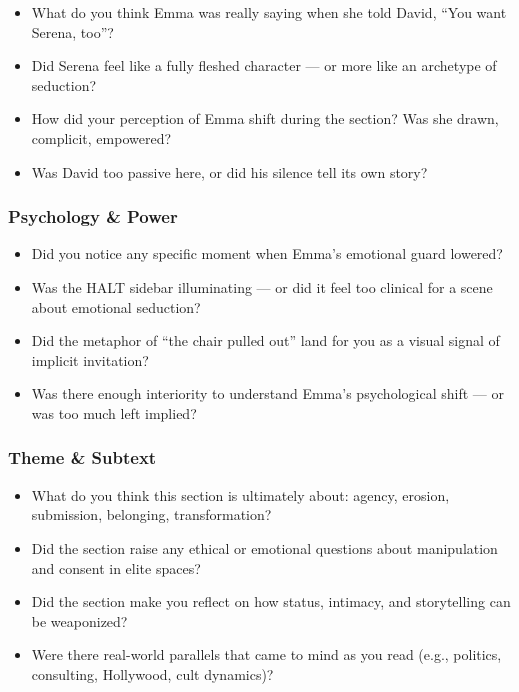 \begin{itemize}
\item What do you think Emma was really saying when she told David, “You want Serena, too”?
\item Did Serena feel like a fully fleshed character — or more like an archetype of seduction?
\item How did your perception of Emma shift during the section? Was she drawn, complicit, empowered?
\item Was David too passive here, or did his silence tell its own story?
\end{itemize}

\subsubsection{Psychology \& Power}

\begin{itemize}
\item Did you notice any specific moment when Emma’s emotional guard lowered?
\item Was the HALT sidebar illuminating — or did it feel too clinical for a scene about emotional seduction?
\item Did the metaphor of “the chair pulled out” land for you as a visual signal of implicit invitation?
\item Was there enough interiority to understand Emma’s psychological shift — or was too much left implied?
\end{itemize}

\subsubsection{Theme \& Subtext}

\begin{itemize}
\item What do you think this section is ultimately about: agency, erosion, submission, belonging, transformation?
\item Did the section raise any ethical or emotional questions about manipulation and consent in elite spaces?
\item Did the section make you reflect on how status, intimacy, and storytelling can be weaponized?
\item Were there real-world parallels that came to mind as you read (e.g., politics, consulting, Hollywood, cult dynamics)?
\end{itemize}

